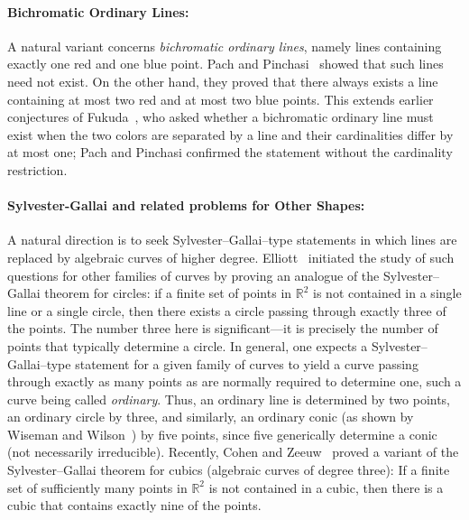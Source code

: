 \documentclass[a4paper,11pt,leqno]{article}
\begin{document}
\paragraph{Bichromatic Ordinary Lines:} A natural variant concerns \emph{bichromatic ordinary lines}, namely lines containing exactly one red and one blue point. Pach and Pinchasi~\cite{PachP00} showed that such lines need not exist. On the other hand, they proved that there always exists a line containing at most two red and at most two blue points. This extends earlier conjectures of Fukuda~\cite{da1998isolating,PachP00}, who asked whether a bichromatic ordinary line must exist when the two colors are separated by a line and their cardinalities differ by at most one; Pach and Pinchasi confirmed the statement without the cardinality restriction.

\vspace{-.3cm}
\paragraph{Sylvester-Gallai and related problems for Other Shapes:} 
A natural direction is to seek Sylvester--Gallai--type statements in which lines are replaced by algebraic curves of higher degree.
Elliott~\cite{elliott1967} initiated the study of such questions for other families of curves by proving an analogue of the Sylvester--Gallai theorem for circles: if a finite set of points in $\mathbb{R}^2$ is not contained in a single line or a single circle, then there exists a circle passing through exactly three of the points. The number three here is significant---it is precisely the number of points that typically determine a circle. In general, one expects a Sylvester--Gallai--type statement for a given family of curves to yield a curve passing through exactly as many points as are normally required to determine one, such a curve being called \emph{ordinary}. Thus, an ordinary line is determined by two points, an ordinary circle by three, and similarly, an ordinary conic (as shown by Wiseman and Wilson~\cite{wiseman1988sylvester}) by five points, since five generically determine a conic (not necessarily irreducible). Recently, Cohen and Zeeuw~\cite{cohen2022sylvester} proved a variant of the Sylvester–Gallai theorem for cubics (algebraic curves of degree three): If a finite set of sufficiently
many points in $\mathbb{R}^2$
is not contained in a cubic, then there is
a cubic that contains exactly nine of the points. 


\vspace{-.3cm}
\end{document}
